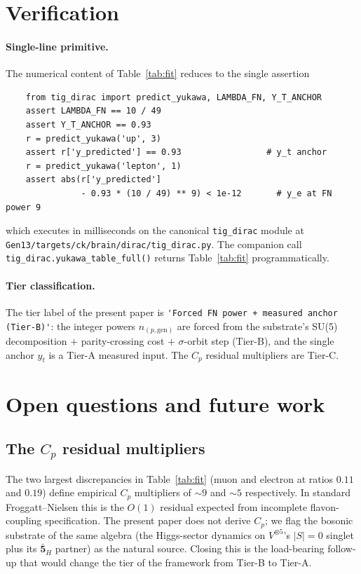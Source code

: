 \documentclass[11pt,reqno]{amsart}
\theoremstyle{plain}
\theoremstyle{definition}
\theoremstyle{remark}
\newcommand{\barrep}[1]{\bar{\mathbf{#1}}}
\begin{document}
\section{Verification}\label{sec:verify}

\paragraph{Single-line primitive.}
The numerical content of Table~\ref{tab:fit} reduces to the
single assertion
\begin{verbatim}
    from tig_dirac import predict_yukawa, LAMBDA_FN, Y_T_ANCHOR
    assert LAMBDA_FN == 10 / 49
    assert Y_T_ANCHOR == 0.93
    r = predict_yukawa('up', 3)
    assert r['y_predicted'] == 0.93                 # y_t anchor
    r = predict_yukawa('lepton', 1)
    assert abs(r['y_predicted']
               - 0.93 * (10 / 49) ** 9) < 1e-12       # y_e at FN power 9
\end{verbatim}
which executes in milliseconds on the canonical
\texttt{tig\_dirac} module at
\texttt{Gen13/targets/ck/brain/dirac/tig\_dirac.py}. The
companion call
\texttt{tig\_dirac.yukawa\_table\_full()} returns
Table~\ref{tab:fit} programmatically.

\paragraph{Tier classification.}
The tier label of the present paper is
\verb|'Forced FN power + measured anchor (Tier-B)'|: the
integer powers $n_{(p,\mathrm{gen})}$ are forced from the
substrate's SU(5) decomposition $+$ parity-crossing cost $+$
$\sigma$-orbit step (Tier-B), and the single anchor $y_{t}$
is a Tier-A measured input. The $C_p$ residual multipliers
are Tier-C.

\section{Open questions and future work}\label{sec:open}

\subsection{The $C_{p}$ residual multipliers}
The two largest discrepancies in Table~\ref{tab:fit} (muon and
electron at ratios $0.11$ and $0.19$) define empirical $C_p$
multipliers of $\sim 9$ and $\sim 5$ respectively. In standard
Froggatt--Nielsen this is the $O(1)$ residual expected from
incomplete flavon-coupling specification. The present paper
does not derive $C_{p}$; we flag the bosonic substrate of the
same algebra (the Higgs-sector dynamics on $V^{\otimes 5}$'s
$|S|=0$ singlet plus its $\barrep{5}_{H}$ partner) as the
natural source. Closing this is the load-bearing follow-up
that would change the tier of the framework from Tier-B to
Tier-A.
\end{document}
